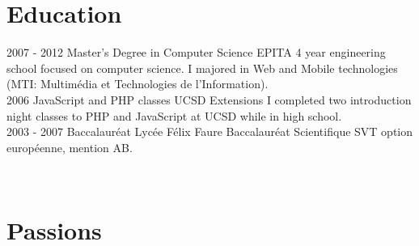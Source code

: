 \documentclass[]{friggeri-cv}
\begin{document}
\section{Education}
\begin{entrylist}
  \entry
    {2007 - 2012}
    {Master's Degree in Computer Science}
    {EPITA}
    {4 year engineering school focused on computer science. I majored in Web and Mobile technologies (MTI: Multimédia et Technologies de l’Information).\\}
  \entry
    {\phantom{2006 -} 2006}
    {JavaScript and PHP classes}
    {UCSD Extensions}
    {I completed two introduction night classes to PHP and JavaScript at UCSD while in high school.\\}
  \entry
    {2003 - 2007}
    {Baccalauréat}
    {Lycée Félix Faure}
    {Baccalauréat Scientifique SVT option européenne, mention AB.}
\end{entrylist}

\begin{aside}
  ~
  ~
  \section{Passions}
  ~
    ~
\end{aside}
\end{document}
